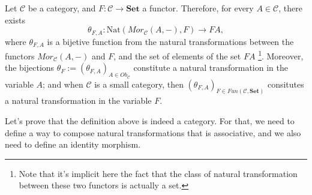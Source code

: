 \begin{lemma}
	Let $\mathcal C$ be a category, and $F:\mathcal C \to \mathbf{Set}$ a functor.
	Therefore, for every $A \in \mathcal C$, there exists
	\begin{displaymath}
		\theta_{F,A}: \text{Nat}(Mor_\mathcal C (A, -), F) \to FA,
	\end{displaymath}
	where $\theta_{F,A}$ is a bijetive function from the natural transformations
	between the functors $Mor_\mathcal C (A, -)$ and $F$, and the set of elements of the set $FA$
	\footnote{Note that it's implicit here the fact that the class of natural transformation between
		these two functors is actually a set.}.
	Moreover, the bijections $\theta_F := (\theta_{F,A})_{A \in Ob_\mathcal C}$ constitute a natural transformation
	in the variable $A$; and when $\mathcal C$ is a small category,
	then $(\theta_{F,A})_{F \in Fun(\mathcal C, \mathbf{Set})}$
	consitutes a natural transformation in the variable $F$.
\end{lemma}

Let's prove that the definition above is indeed a category.
For that, we need to define a way to compose natural transformations that
is associative, and we also need to define an identity morphism.

